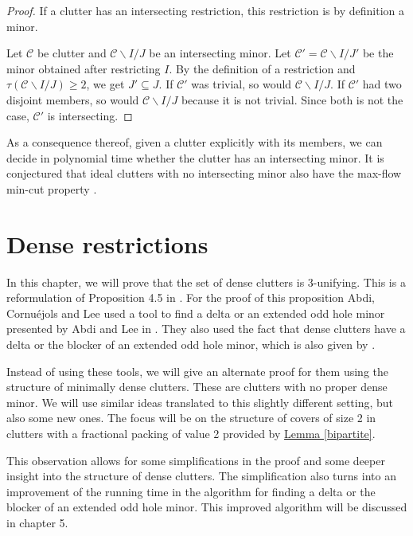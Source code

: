 \documentclass[a4paper, 12pt]{scrbook}
\theoremstyle{definition}
\begin{document}
  \begin{proof}
      If a clutter has an intersecting restriction, this restriction is by definition a minor.

      Let $\mathcal{C}$ be clutter and $\mathcal{C} \backslash I /J$ be an intersecting minor.
      Let $\mathcal{C'}=\mathcal{C} \backslash I /J'$ be the minor obtained after restricting $I$.
      By the definition of a restriction and $\tau(\mathcal{C} \backslash I /J) \geq 2$, we get $J' \subseteq J$. If $\mathcal{C'}$ was trivial, so would $\mathcal{C} \backslash I / J$.
      If $\mathcal{C'}$ had two disjoint members, so would $\mathcal{C} \backslash I /J$ because it is not trivial.
      Since both is not the case, $\mathcal{C'}$ is intersecting.
  \end{proof}

  As a consequence thereof, given a clutter explicitly with its members, we can decide in polynomial time whether the clutter has an intersecting minor. It is conjectured that ideal clutters with no intersecting minor also have the max-flow min-cut property \cite{restrictions}.


   \chapter{Dense restrictions}
   In this chapter, we will prove that the set of dense clutters is 3-unifying.
   This is a reformulation of Proposition 4.5 in \cite{restrictions}.
   For the proof of this proposition Abdi, Cornuéjols and Lee used a tool to find a delta or an extended odd hole minor presented by Abdi and Lee in \cite{deltas}. They also used the fact that dense clutters have a delta or the blocker of an extended odd hole minor, which is also given by \cite{deltas}.


   Instead of using these tools, we will give an alternate proof for them using the structure of minimally dense clutters. These are clutters with no proper dense minor.
   We will use similar ideas translated to this slightly different setting, but also some new ones.
   The focus will be on the structure of covers of size 2 in clutters with a fractional packing of value 2 provided by \hyperref[bipartite]{Lemma \ref*{bipartite}}.

   This observation allows for some simplifications in the proof and some deeper insight into the structure of dense clutters.
   The simplification also turns into an improvement of the running time in the algorithm for finding a delta or the blocker of an extended odd hole minor. This improved algorithm will be discussed in chapter 5.
\end{document}
